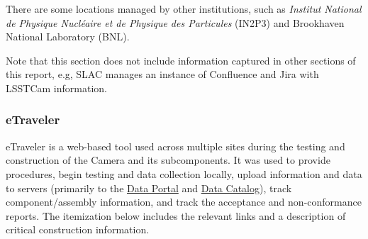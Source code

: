There are some locations managed by other institutions, such as \textit{Institut National de Physique Nucléaire et de Physique des Particules} (IN2P3) and Brookhaven National Laboratory (BNL).

Note that this section does not include information captured in other sections of this report, e.g, SLAC manages an instance of Confluence and Jira with LSSTCam information.

\subsubsection{eTraveler}

eTraveler is a web-based tool used across multiple sites during the testing and construction of the Camera and its subcomponents.
It was used to provide procedures, begin testing and data collection locally, upload information and data to servers (primarily to the \href{http://lsst-camera.slac.stanford.edu/DataPortal/}{Data Portal} and \href{http://srs.slac.stanford.edu/DataCatalog/?experiment=LSST-CAMERA}{Data Catalog}), track component/assembly information, and track the acceptance and non-conformance reports.
The itemization below includes the relevant links and a description of critical construction information.

